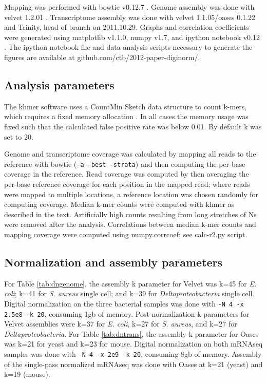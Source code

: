 \documentclass[10pt]{article}
\begin{document}
Mapping was performed with bowtie v0.12.7 \cite{pubmed19261174}.
Genome assembly was done with velvet 1.2.01 \cite{pubmed18349386}.
Transcriptome assembly was done with velvet 1.1.05/oases 0.1.22 and
Trinity, head of branch on 2011.10.29.
Graphs and correlation coefficients were generated using matplotlib
v1.1.0, numpy v1.7, and ipython notebook v0.12 \cite{ipython}.  The
ipython notebook file and data analysis scripts necessary to generate
the figures are available at 
  github.com/ctb/2012-paper-diginorm/.


\subsection*{Analysis parameters}

The khmer software uses a CountMin Sketch data structure to count
k-mers, which requires a fixed memory allocation
\cite{countminsketch}.  In all cases the memory usage was fixed such
that the calculated false positive rate was below 0.01.  By default k
was set to 20.

Genome and transcriptome coverage was calculated by mapping all reads
to the reference with bowtie ({\tt -a --best --strata}) and then
computing the per-base coverage in the reference.  Read coverage was
computed by then averaging the per-base reference coverage for each
position in the mapped read; where reads were mapped to multiple
locations, a reference location was chosen randomly for computing
coverage.  Median k-mer counts were computed with khmer as described
in the text.  Artificially high counts resulting from long stretches
of Ns were removed after the analysis.
Correlations between median k-mer counts and mapping coverage were
computed using numpy.corrcoef; see calc-r2.py script.

\subsection*{Normalization and assembly parameters}

For Table \ref{tab:dngenome}, the assembly k parameter for Velvet was
k=45 for {\em E. coli}; k=41 for {\em S. aureus} single cell; and k=39
for {\em Deltaproteobacteria} single cell.  Digital normalization
on the three bacterial samples was done with {\tt -N 4 -x 2.5e8 -k 20},
consuming 1gb of memory.  Post-normalization k parameters for Velvet
assemblies were k=37 for {\em E. coli}, k=27 for {\em S. aureus}, and k=27 for {\em Deltaproteobacteria}.
For Table \ref{tab:dntrans}, the assembly k parameter for Oases was k=21 for yeast
and k=23 for mouse.  Digital normalization on both mRNAseq samples was done
with {\tt -N 4 -x 2e9 -k 20}, consuming 8gb of memory.  Assembly of the
single-pass normalized mRNAseq was done with Oases at k=21 (yeast) and k=19
(mouse).
\end{document}

